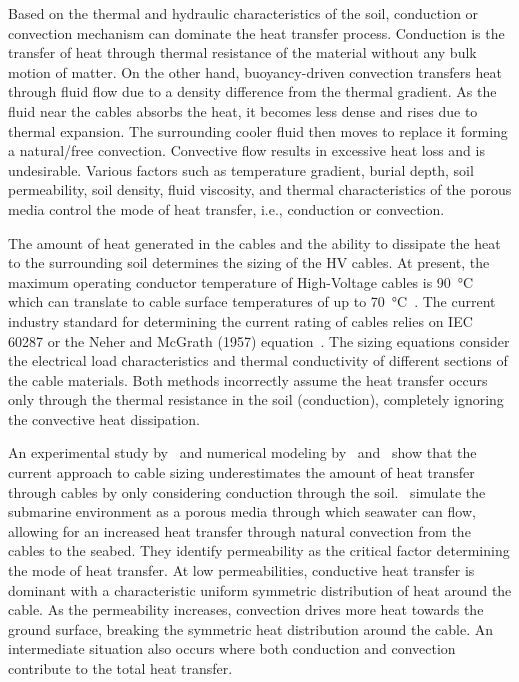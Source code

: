 \documentclass[Journal,letterpaper,InsideFigs]{ascelike-new}
\begin{document}
Based on the thermal and hydraulic characteristics of the soil, conduction or convection mechanism can dominate the heat transfer process. Conduction is the transfer of heat through thermal resistance of the material without any bulk motion of matter. On the other hand, buoyancy-driven convection transfers heat through fluid flow due to a density difference from the thermal gradient. As the fluid near the cables absorbs the heat, it becomes less dense and rises due to thermal expansion. The surrounding cooler fluid then moves to replace it forming a natural/free convection. Convective flow results in excessive heat loss and is undesirable. Various factors such as temperature gradient, burial depth, soil permeability, soil density, fluid viscosity, and thermal characteristics of the porous media control the mode of heat transfer, i.e., conduction or convection. 

The amount of heat generated in the cables and the ability to dissipate the heat to the surrounding soil determines the sizing of the HV cables. At present, the maximum operating conductor temperature of High-Voltage cables is \SI{90}{\celsius} which can translate to cable surface temperatures of up to \SI{70}{\celsius}~\cite{hughes2015effect,swaffield2008methods}. The current industry standard for determining the current rating of cables relies on IEC 60287 or the Neher and McGrath (1957) equation~\cite{neher1994calculation,IEC60287:2006}. The sizing equations consider the electrical load characteristics and thermal conductivity of different sections of the cable materials. Both methods incorrectly assume the heat transfer occurs only through the thermal resistance in the soil (conduction), completely ignoring the convective heat dissipation.

An experimental study by~ and numerical modeling by~ and~ show that the current approach to cable sizing underestimates the amount of heat transfer through cables by only considering conduction through the soil.~ simulate the submarine environment as a porous media through which seawater can flow, allowing for an increased heat transfer through natural convection from the cables to the seabed. They identify permeability as the critical factor determining the mode of heat transfer. At low permeabilities, conductive heat transfer is dominant with a characteristic uniform symmetric distribution of heat around the cable. As the permeability increases, convection drives more heat towards the ground surface, breaking the symmetric heat distribution around the cable. An intermediate situation also occurs where both conduction and convection contribute to the total heat transfer. 
\end{document}

